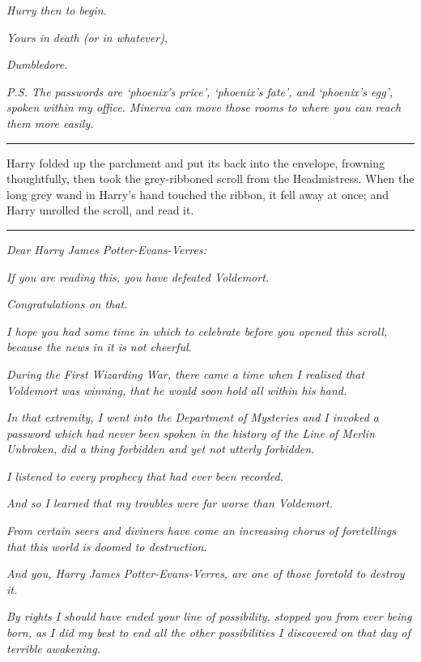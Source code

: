 \emph{Hurry then to begin.}

\emph{Yours in death (or in whatever),}

\emph{Dumbledore.}

\emph{P.S. The passwords are `phoenix's price', `phoenix's fate', and `phoenix's egg', spoken within my office. Minerva can move those rooms to where you can reach them more easily.}

\begin{center}\rule{3in}{0.4pt}\end{center}

Harry folded up the parchment and put its back into the envelope, frowning thoughtfully, then took the grey-ribboned scroll from the Headmistress. When the long grey wand in Harry's hand touched the ribbon, it fell away at once; and Harry unrolled the scroll, and read it.

\begin{center}\rule{3in}{0.4pt}\end{center}

\emph{Dear Harry James Potter-Evans-Verres:}

\emph{If you are reading this, you have defeated Voldemort.}

\emph{Congratulations on that.}

\emph{I hope you had some time in which to celebrate before you opened this scroll, because the news in it is not cheerful.}

\emph{During the First Wizarding War, there came a time when I realised that Voldemort was winning, that he would soon hold all within his hand.}

\emph{In that extremity, I went into the Department of Mysteries and I invoked a password which had never been spoken in the history of the Line of Merlin Unbroken, did a thing forbidden and yet not utterly forbidden.}

\emph{I listened to every prophecy that had ever been recorded.}

\emph{And so I learned that my troubles were far worse than Voldemort.}

\emph{From certain seers and diviners have come an increasing chorus of foretellings that this world is doomed to destruction.}

\emph{And you, Harry James Potter-Evans-Verres, are one of those foretold to destroy it.}

\emph{By rights I should have ended your line of possibility, stopped you from ever being born, as I did my best to end all the other possibilities I discovered on that day of terrible awakening.}

